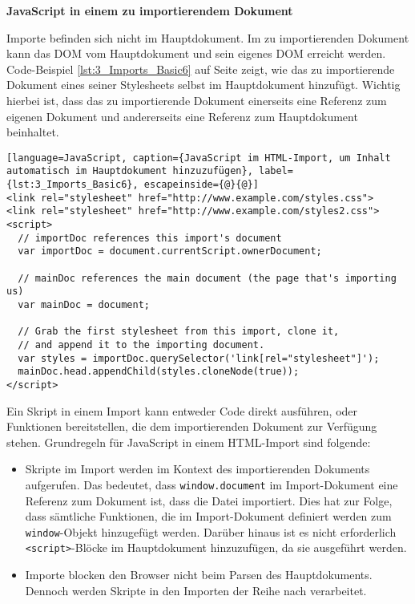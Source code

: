 \textbf{JavaScript in einem zu importierendem Dokument}

Importe befinden sich nicht im Hauptdokument.
Im zu importierenden Dokument kann das DOM vom Hauptdokument und sein eigenes DOM erreicht werden. Code-Beispiel \ref{lst:3_Imports_Basic6} auf Seite \pageref{lst:3_Imports_Basic6} zeigt, wie das zu importierende Dokument eines seiner Stylesheets selbst im Hauptdokument hinzufügt. Wichtig hierbei ist, dass das zu importierende Dokument einerseits eine Referenz zum eigenen Dokument und andererseits eine Referenz zum Hauptdokument beinhaltet.

\begin{lstlisting}[language=JavaScript, caption={JavaScript im HTML-Import, um Inhalt automatisch im Hauptdokument hinzuzufügen}, label={lst:3_Imports_Basic6}, escapeinside={@}{@}]
<link rel="stylesheet" href="http://www.example.com/styles.css">
<link rel="stylesheet" href="http://www.example.com/styles2.css">
<script>
  // importDoc references this import's document
  var importDoc = document.currentScript.ownerDocument;

  // mainDoc references the main document (the page that's importing us)
  var mainDoc = document;

  // Grab the first stylesheet from this import, clone it,
  // and append it to the importing document.
  var styles = importDoc.querySelector('link[rel="stylesheet"]');
  mainDoc.head.appendChild(styles.cloneNode(true));
</script>
\end{lstlisting}

Ein Skript in einem Import kann entweder Code direkt ausführen, oder Funktionen bereitstellen, die dem importierenden Dokument zur Verfügung stehen. Grundregeln für JavaScript in einem HTML-Import sind folgende:
\begin{itemize}
\item Skripte im Import werden im Kontext des importierenden Dokuments aufgerufen. Das bedeutet, dass \lstinline|window.document| im Import-Dokument eine Referenz zum Dokument ist, dass die Datei importiert. Dies hat zur Folge, dass sämtliche Funktionen, die im Import-Dokument definiert werden zum \lstinline|window|-Objekt hinzugefügt werden. Darüber hinaus ist es nicht erforderlich \lstinline|<script>|-Blöcke im Hauptdokument hinzuzufügen, da sie ausgeführt werden.
\item Importe blocken den Browser nicht beim Parsen des Hauptdokuments. Dennoch werden Skripte in den Importen der Reihe nach verarbeitet.
\end{itemize}

